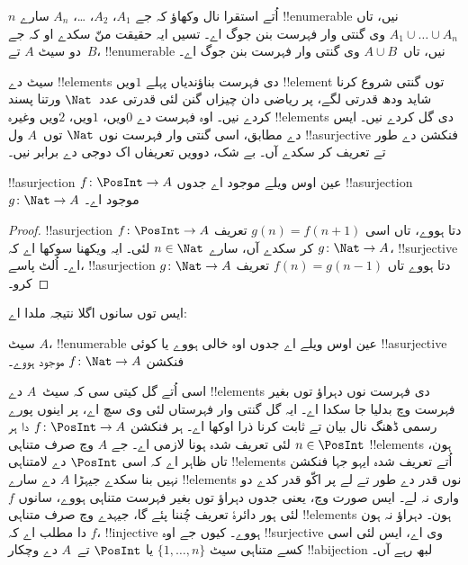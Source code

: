 \documentclass[../../../include/open-logic-section]{subfiles}
\begin{document}
\begin{prob}
  $n$ اُتے استقرا نال وکھاؤ کہ جے $A_1$، $A_2$، \dots، $A_n$ سارے
  !!{enumerable} نیں، تاں $A_1 \cup \dots \cup A_n$ وی گنتی وار فہرست بنن جوگ
  اے۔ تسیں ایہ حقیقت منّ سکدے او کہ جے دو سیٹ $A$ تے~$B$،
  !!{enumerable} نیں، تاں~$A \cup B$ وی گنتی وار فہرست بنن جوگ اے۔
\end{prob}

سیٹ دے !!{element}s دی فہرست بناؤندیاں پہلے $1$ویں !!{element} توں
گنتی شروع کرنا شاید ودھ قدرتی لگے، پر ریاضی دان چیزاں گنن لئی قدرتی
عدد~$\Nat$ ورتنا پسند کردے نیں۔ اوہ فہرست دے $0$ویں، $1$ویں، $2$ویں
وغیرہ !!{element}s دی گل کردے نیں۔ ایس دے مطابق، اسی گنتی وار فہرست
نوں $\Nat$ توں~$A$ ول !!a{surjective} فنکشن دے طور تے تعریف کر سکدے
آں۔ بے شک، دوویں تعریفاں اک دوجی دے برابر نیں۔

\begin{prop}
  !!a{surjection} $f\colon \PosInt \to A$ عین اوس ویلے موجود اے جدوں
  !!a{surjection} $g\colon \Nat \to A$ موجود اے۔
\end{prop}

\begin{proof}
  !!a{surjection} $f\colon \PosInt \to A$ دتا ہووے، تاں اسی
  $g(n) = f(n+1)$ تعریف کر سکدے آں، سارے $n \in \Nat$ لئی۔ ایہ ویکھنا
  سوکھا اے کہ $g\colon \Nat \to A$، !!{surjective} اے۔ اُلٹ پاسے،
  !!a{surjection} $g\colon \Nat \to A$ دتا ہووے تاں
  $f(n) = g(n-1)$ تعریف کرو۔
\end{proof}

ایس توں سانوں اگلا نتیجہ ملدا اے:

\begin{cor}
سیٹ $A$، !!{enumerable} عین اوس ویلے اے جدوں اوہ خالی ہووے یا کوئی
!!a{surjective} فنکشن $f\colon \Nat \to A$ موجود ہووے۔
\end{cor}

اسی اُتے گل کیتی سی کہ سیٹ~$A$ دے !!{element}s دی فہرست نوں دہراؤ
توں بغیر فہرست وچ بدلیا جا سکدا اے۔ ایہ گل گنتی وار فہرستاں لئی وی
سچ اے، پر اینوں پورے رسمی ڈھنگ نال بیان تے ثابت کرنا ذرا اوکھا اے۔ ہر
فنکشن $f\colon \PosInt \to A$ دا ہر $n \in \PosInt$ لئی تعریف شدہ
ہونا لازمی اے۔ جے $A$ وچ صرف متناہی !!{element}s ہون، تاں ظاہر اے کہ
اسی $\PosInt$ دے لامتناہی !!{element}s اُتے تعریف شدہ ایہو جہا فنکشن
نہیں بنا سکدے جیہڑا $A$ دے سارے !!{element}s نوں قدر دے طور تے لے پر
اکّو قدر کدے دو واری نہ لے۔ ایس صورت وچ، یعنی جدوں دہراؤ توں بغیر
فہرست متناہی ہووے، سانوں $f$ لئی ہور دائرۂ تعریف چُننا پئے گا، جیہدے
وچ صرف متناہی !!{element}s ہون۔ دہراؤ نہ ہون دا مطلب اے کہ $f$،
!!{injective} ہووے۔ کیوں جے اوہ !!{surjective} وی اے، ایس لئی اسی کسے
متناہی سیٹ $\{1, \dots, n\}$ یا $\PosInt$ تے~$A$ دے وچکار
!!a{bijection} لبھ رہے آں۔
\end{document}
